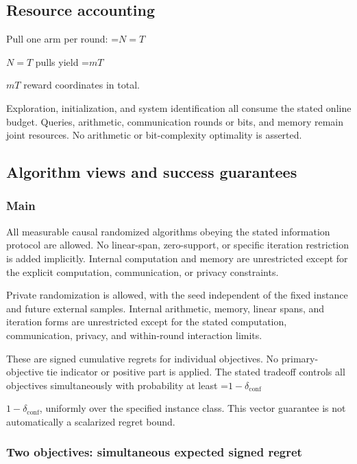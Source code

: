 \documentclass[10pt,a4paper]{article}
\newcommand{\AtlasMath}[1]{\par\begingroup\centering\setbox0=\hbox{$\displaystyle #1$}\ifdim\wd0>1.4\linewidth\typeout{ATLAS WIDE FORMULA: \the\wd0}\fi\ifdim\wd0>\linewidth\resizebox{\linewidth}{!}{\box0}\else\box0\fi\par\endgroup}
\newcommand{\AtlasInlineMath}[1]{\begingroup\setbox0=\hbox{$#1$}\ifdim\wd0>.4\linewidth\endgroup\AtlasMath{#1}\else\endgroup$#1$\fi}
\begin{document}
\subsection{Resource accounting}


Pull one arm per round: \AtlasInlineMath{N=T} pulls yield \AtlasInlineMath{mT} reward coordinates in total.



Exploration, initialization, and system identification all consume the stated online budget. Queries, arithmetic, communication rounds or bits, and memory remain joint resources. No arithmetic or bit-complexity optimality is asserted.



\subsection{Algorithm views and success guarantees}


\subsubsection{Main}


All measurable causal randomized algorithms obeying the stated information protocol are allowed. No linear-span, zero-support, or specific iteration restriction is added implicitly. Internal computation and memory are unrestricted except for the explicit computation, communication, or privacy constraints.



Private randomization is allowed, with the seed independent of the fixed instance and future external samples. Internal arithmetic, memory, linear spans, and iteration forms are unrestricted except for the stated computation, communication, privacy, and within-round interaction limits.



These are signed cumulative regrets for individual objectives. No primary-objective tie indicator or positive part is applied. The stated tradeoff controls all objectives simultaneously with probability at least \AtlasInlineMath{1-\delta_{\mathrm{conf}}}, uniformly over the specified instance class. This vector guarantee is not automatically a scalarized regret bound.



\subsubsection{Two objectives: simultaneous expected signed regret}
\end{document}
